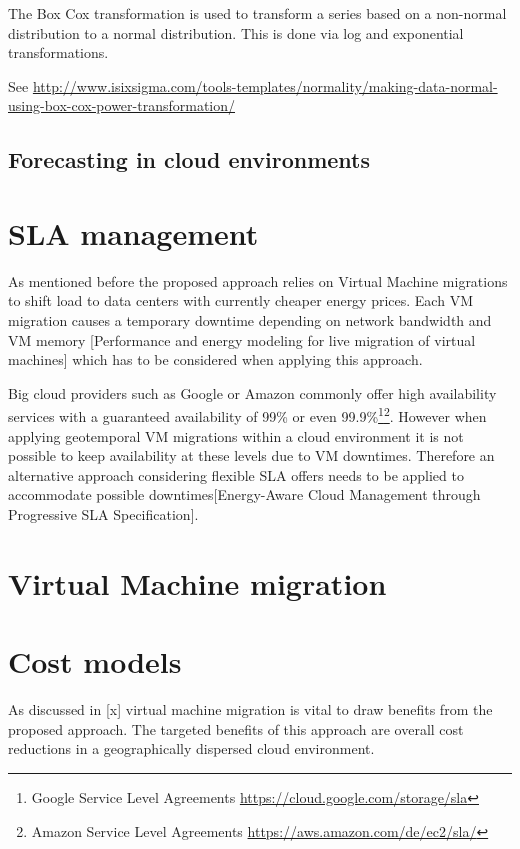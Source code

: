 The Box Cox transformation is used to transform a series based on a non-normal distribution to a normal distribution. This is done via log and exponential transformations. 

See \url{http://www.isixsigma.com/tools-templates/normality/making-data-normal-using-box-cox-power-transformation/}



\subsection{Forecasting in cloud environments}


\section{SLA management}

As mentioned before the proposed approach relies on Virtual Machine migrations to shift load to data centers with currently cheaper energy prices. Each VM migration causes a temporary downtime depending on network bandwidth and VM memory [Performance and energy modeling for live migration of virtual machines] which has to be considered when applying this approach. 

Big cloud providers such as Google or Amazon commonly offer high availability services with a guaranteed availability of 99\% or even 99.9\%\footnote{Google Service Level Agreements \url{https://cloud.google.com/storage/sla}}\footnote{Amazon Service Level Agreements \url{https://aws.amazon.com/de/ec2/sla/}}. However when applying geotemporal VM migrations within a cloud environment it is not possible to keep availability at these levels due to VM downtimes. Therefore an alternative approach considering flexible SLA offers needs to be applied to accommodate possible downtimes[Energy-Aware Cloud Management through Progressive SLA Specification]. 


\section{Virtual Machine migration}


\section{Cost models}

As discussed in [x] virtual machine migration is vital to draw benefits from the proposed approach. The targeted benefits of this approach are overall cost reductions in a geographically dispersed cloud environment. 

